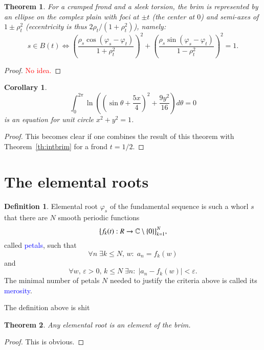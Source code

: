 \documentclass{article}
\newcommand{\red}[1]{\textcolor{red}{#1}}
\newcommand{\blue}[1]{\textcolor{blue}{#1}}
\theoremstyle{plain}
\newtheorem{theorem}{Theorem}[section]
\newtheorem{corollary}{Corollary}[theorem]
\theoremstyle{definition}
\newtheorem{definition}{Definition}[section]
\newcommand{\cmz}{\mathbb C \setminus \{0\} }
\begin{document}
    \begin{theorem}
        For a cramped frond and a sleek torsion, the brim is represented by an ellipse on the complex plain with foci at $\pm t$ (the center at $0$) and semi-axes of $1\pm\rho_t^2$ (eccentricity is thus $2\rho_t/(1+\rho_t^2)$), namely:
        $$
            s \in B(t) \Leftrightarrow \left(\frac{\rho_s\cos(\varphi_s-\varphi_t)}{1+\rho_t^2}\right)^2 + \left(\frac{\rho_s\sin(\varphi_s-\varphi_t)}{1-\rho_t^2}\right)^2 = 1 
        .$$
    \end{theorem}
    \begin{proof}
        \red{No idea.}
    \end{proof}

    \begin{corollary}
        $$
            \int_0^{2\pi} \ln\left(\left(\sin\theta+\frac{5x}4\right)^2+\frac{9y^2}{16}\right)d\theta = 0  
        $$ is an equation for unit circle $x^2+y^2=1$.

    \end{corollary}

    \begin{proof}
        This becomes clear if one combines the result of this theorem with Theorem~\ref{th:intbrim} for a frond $t=1/2$.  
    \end{proof}

\section{The elemental roots}
    \begin{definition}
        Elemental root $\varphi_s$ of the fundamental sequence is such a whorl $s$ that there are $N$ smooth periodic functions 
        $$ 
            \big\{f_k(t): \mathbb \mathbb R \rightarrow \cmz\big\}_{k=1}^N 
        ,$$ called \blue{petals}, such that $$
            \forall n %
            \; \exists k\le N %
            ,\,w %
            :\; a_n = f_k(w) 
        $$ and $$
            \forall w,\,\varepsilon >0,\,k\le N \; \exists n :\; |a_n - f_k(w)|<\varepsilon
        .$$
        The minimal number of petals $N$ needed to justify the criteria above is called its \blue{merosity}.  	
    \end{definition}
    The definition above is shit
    \begin{theorem}
        Any elemental root is an element of the brim.
    \end{theorem}
    \begin{proof}
        This is obvious.
    \end{proof}
\end{document}
